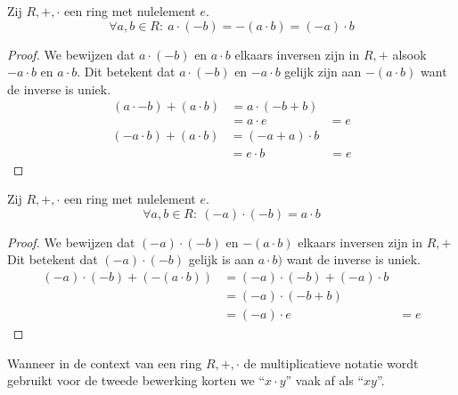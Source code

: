 \documentclass[main.tex]{subfiles}
\begin{document}
\begin{ei}
  \label{ei:min-door-maal}
  Zij $R,+,\cdot$ een ring met nulelement $e$. 
  \[ \forall a,b \in R:\ a \cdot (-b) = -(a \cdot b) = (-a) \cdot b \]
 
  \begin{proof}
    We bewijzen dat $a \cdot (-b)$ en $a \cdot b$ elkaars inversen zijn in $R,+$ alsook $-a \cdot b$ en $a \cdot b$.
    Dit betekent dat $a \cdot (-b)$ en $-a \cdot b$ gelijk zijn aan $-(a \cdot b)$ want de inverse is uniek.
    \[
    \begin{array}{rll}
      (a \cdot -b) + (a \cdot b) &= a \cdot (-b + b) &\\
                                 &= a \cdot e &= e 
    \end{array}
    \]  
    \[
    \begin{array}{rll}
      (-a \cdot b) + (a \cdot b) &= (-a + a) \cdot b &\\
                                 &= e \cdot b &= e 
    \end{array}
    \]      
  \end{proof}
\end{ei}

\begin{ei}
  Zij $R,+,\cdot$ een ring met nulelement $e$.
  \[ \forall a,b \in R:\ (-a) \cdot (-b) = a \cdot b \]

  \begin{proof}
    We bewijzen dat $(-a) \cdot (-b)$ en $-(a \cdot b)$ elkaars inversen zijn in $R,+$
    Dit betekent dat $(-a) \cdot (-b)$ gelijk is aan $a \cdot b)$ want de inverse is uniek.
    \[
    \begin{array}{rll}
      (-a) \cdot (-b) + (- (a \cdot b)) &= (-a) \cdot (-b) + (-a) \cdot b &\\
                                        &= (-a) \cdot (-b + b) &\\
                                        &= (-a) \cdot e &= e
    \end{array}
    \]
  \end{proof}
\end{ei}

\begin{de}
  Wanneer in de context van een ring $R,+,\cdot$ de multiplicatieve notatie wordt gebruikt voor de tweede bewerking korten we ``$x \cdot y$'' vaak af als ``$xy$''.
\end{de}
\end{document}
